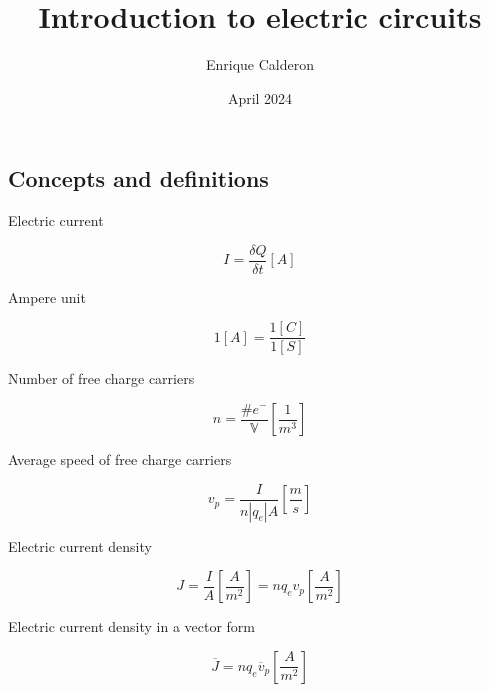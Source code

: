 \documentclass[letterpaper]{article}
\title{Introduction to electric circuits}
\author{Enrique Calderon}
\date{April 2024}
\newcommand{\divline}{\noindent\makebox[\linewidth]{\rule{\textwidth}{0.4pt}}}
\begin{document}
    \maketitle
    \divline
    
    \begin{multicols}{2}
        \section{Concepts and definitions}
        
        Electric current

        \[I = \frac{\delta Q}{\delta t} [A]\]

        Ampere unit

        \[1 [A] = \frac{1[C]}{1[S]}\]

        Number of free charge carriers

        \[n = \frac{\# e^{-}}{\mathbb{V}} \left[ \frac{1}{m^{3}} \right]\]

        Average speed of free charge carriers

        \[v_{p} = \frac{I}{n \left| q_{e} \right| A } \left[ \frac{m}{s} \right] \]

        Electric current density

        \[J = \frac{I}{A} \left[ \frac{A}{m^{2}} \right] = n q_{e} v_{p} \left[ \frac{A}{m^{2}} \right] \]

        Electric current density in a vector form

        \[\overline{J} = n q_{e} \overline{v}_{p} \left[ \frac{A}{m^{2}} \right] \]
    \end{multicols}
    \divline
\end{document}
